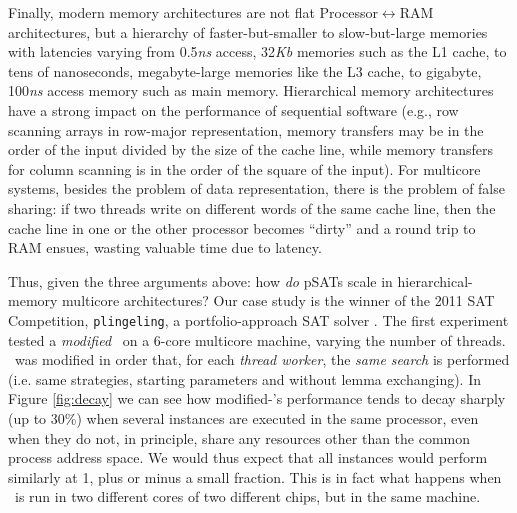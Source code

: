 \documentclass{llncs}
\begin{document}
Finally, modern memory architectures are not flat
Processor$\leftrightarrow$RAM architectures, but a hierarchy of
faster-but-smaller to slow-but-large memories with latencies varying
from 0.5{\it ns} access, 32{\it Kb} memories such as the L1 cache, to
tens of nanoseconds, megabyte-large memories like the L3 cache, to
gigabyte, 100{\it ns} access memory such as main memory. Hierarchical
memory architectures have a strong impact on the performance of
sequential software (e.g., row scanning arrays in row-major
representation, memory transfers may be in the order of the input
divided by the size of the cache line, while memory transfers for
column scanning is in the order of the square of the input). For
multicore systems, besides the problem of data representation, there
is the problem of false sharing: if two threads write on different
words of the same cache line, then the cache line in one or the other
processor becomes ``dirty'' and a round trip to RAM ensues, wasting
valuable time due to latency.

Thus, given the three arguments above: how {\em do} pSATs scale in
hierarchical-memory multicore architectures? Our case study is the
winner of the 2011 SAT Competition, {\tt plingeling}, a
portfolio-approach SAT solver \cite{lingeling}. The first experiment
tested a \emph{modified} \pling\ on a 6-core multicore machine,
varying the number of threads. \pling\ was modified in order that, for
each {\em thread worker}, the {\em same search} is performed
(i.e. same strategies, starting parameters and without lemma
exchanging).  In Figure \ref{fig:decay} we can see how
modified-\pling's performance tends to decay sharply (up to 30\%) when
several instances are executed in the same processor, even when they
do not, in principle, share any resources other than the common
process address space. We would thus expect that all instances would
perform similarly at 1, plus or minus a small fraction. This is in
fact what happens when \pling\ is run in two different cores of two
different chips, but in the same machine.
\end{document}
